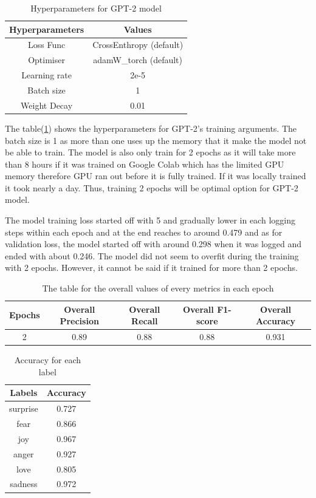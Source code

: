 \begin{table}[h!]
    \centering
    \begin{tabular}{c|c}
        Hyperparameters & Values\\\hline
        Loss Func & CrossEnthropy (default)\\
        Optimiser & adamW\_torch (default)\\
        Learning rate & 2e-5\\
        Batch size & 1\\
        Weight Decay & 0.01\\
    \end{tabular}
    \caption{Hyperparameters for GPT-2 model}
    \label{tab:hyp_GPT}
\end{table}

The table(\ref{tab:hyp_GPT}) shows the hyperparameters for GPT-2's training arguments. The batch size is 1 as more than one uses up the memory that it make the model not be able to train. The model is also only train for 2 epochs as it will take more than 8 hours if it was trained on Google Colab which has the limited GPU memory therefore GPU ran out before it is fully trained. If it was locally trained it took nearly a day. Thus, training 2 epochs will be optimal option for GPT-2 model. 

The model training loss started off with 5 and gradually lower in each logging steps within each epoch and at the end reaches to around 0.479 and as for validation loss, the model started off with around 0.298 when it was logged and ended with about 0.246. The model did not seem to overfit during the training with 2 epochs. However, it cannot be said if it trained for more than 2 epochs.

\begin{table}[h!]
    \centering
    \begin{tabular}{|c|c|c|c|c|}\hline
          Epochs  & Overall Precision & Overall Recall & Overall F1-score & Overall Accuracy\\\hline
           2 & 0.89 & 0.88 & 0.88 & 0.931\\\hline
    \end{tabular}
    \caption{The table for the overall values of every metrics in each epoch}
    \label{tab:overall_metrics_gpt2}
\end{table}

\begin{table}[h!]
    \centering
    \begin{tabular}{c|c}
       Labels  & Accuracy\\\hline
        surprise & 0.727\\
        fear & 0.866\\
        joy & 0.967\\
        anger & 0.927\\
        love & 0.805\\
        sadness & 0.972\\
    \end{tabular}
    \caption{Accuracy for each label}
    \label{tab:acc_each_labels}
\end{table}

